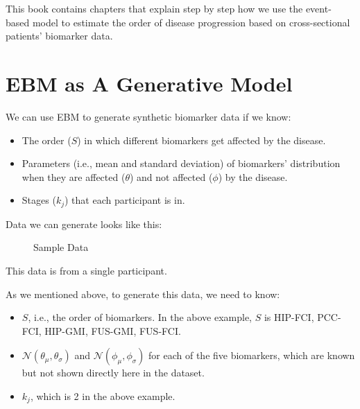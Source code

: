 \documentclass[
  letterpaper,
  DIV=11,
  numbers=noendperiod]{scrreprt}
\providecommand{\tightlist}{%
  \setlength{\itemsep}{0pt}\setlength{\parskip}{0pt}}\usepackage{longtable,booktabs,array}
\begin{document}
This book contains chapters that explain step by step how we use the
event-based model to estimate the order of disease progression based on
cross-sectional patients' biomarker data.


\chapter{EBM as A Generative Model}\label{sec-gen}

We can use EBM to generate synthetic biomarker data if we know:

\begin{itemize}
\tightlist
\item
  The order (\(S\)) in which different biomarkers get affected by the
  disease.
\item
  Parameters (i.e., mean and standard deviation) of biomarkers'
  distribution when they are affected (\(\theta\)) and not affected
  (\(\phi\)) by the disease.
\item
  Stages (\(k_j\)) that each participant is in.
\end{itemize}

Data we can generate looks like this:

\begin{figure}


\caption{\label{fig-sample-data}Sample Data}

\end{figure}%

This data is from a single participant.

As we mentioned above, to generate this data, we need to know:

\begin{itemize}
\tightlist
\item
  \(S\), i.e., the order of biomarkers. In the above example, \(S\) is
  HIP-FCI, PCC-FCI, HIP-GMI, FUS-GMI, FUS-FCI.
\item
  \(\mathcal N(\theta_{\mu}, \theta_{\sigma})\) and
  \(\mathcal N(\phi_{\mu}, \phi_{\sigma})\) for each of the five
  biomarkers, which are known but not shown directly here in the
  dataset.
\item
  \(k_j\), which is 2 in the above example.
\end{itemize}
\end{document}
